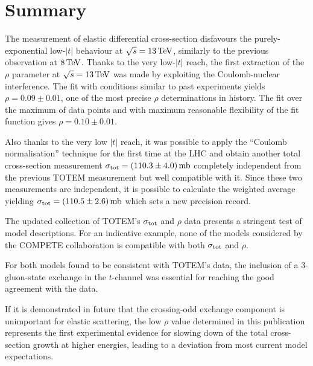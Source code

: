 \section{Summary}
\label{sec:summary}

The measurement of elastic differential cross-section disfavours the purely-exponential low-$|t|$ behaviour at $\sqrt s = 13\,{\rm TeV}$, similarly to the previous observation at $8\,{\rm TeV}$. Thanks to the very low-$|t|$ reach, the first extraction of the $\rho$ parameter at $\sqrt s = 13\,{\rm TeV}$ was made by exploiting the Coulomb-nuclear interference. The fit with conditions similar to past experiments yields $\rho = 0.09 \pm 0.01$, one of the most precise $\rho$ determinations in history. The fit over the maximum of data points and with maximum reasonable flexibility of the fit function gives $\rho = 0.10 \pm 0.01$.

Also thanks to the very low $|t|$ reach, it was possible to apply the ``Coulomb normalisation'' technique for the first time at the LHC and obtain another total cross-section measurement $\sigma_{\rm tot} = (110.3 \pm 4.0)\,{\rm mb}$ completely independent from the previous TOTEM measurement \cite{totem-13tev-90m} but well compatible with it. Since these two measurements are independent, it is possible to calculate the weighted average yielding $\sigma_{\rm tot} = (110.5 \pm 2.6)\,{\rm mb}$ which sets a new precision record.

The updated collection of TOTEM's $\sigma_{\rm tot}$ and $\rho$ data presents a stringent test of model descriptions. For an indicative example, none of the models considered by the COMPETE collaboration is compatible with both $\sigma_{\rm tot}$ and $\rho$.

For both models found to be consistent with TOTEM's data, the inclusion of a 3-gluon-state exchange in the $t$-channel was essential for reaching the good agreement with the data.

If it is demonstrated in future that the crossing-odd exchange component is unimportant for elastic scattering, the low $\rho$ value determined in this publication represents the first experimental evidence for slowing down of the total cross-section growth at higher energies, leading to a deviation from most current model expectations.

